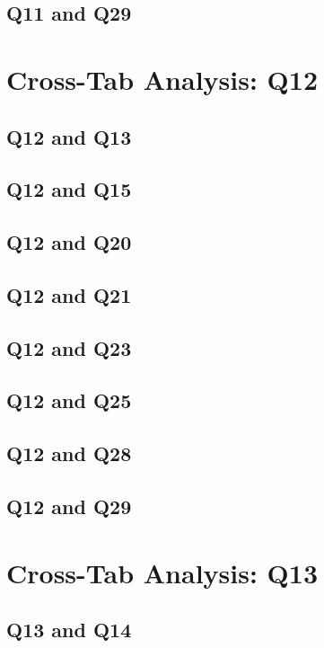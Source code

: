 \documentclass{report}
\begin{document}
\section{Q11 and Q29}\clearpage

\chapter{Cross-Tab Analysis: Q12}

\section{Q12 and Q13}\clearpage
\section{Q12 and Q15}\clearpage
\section{Q12 and Q20}\clearpage
\section{Q12 and Q21}\clearpage
\section{Q12 and Q23}\clearpage
\section{Q12 and Q25}\clearpage
\section{Q12 and Q28}\clearpage
\section{Q12 and Q29}\clearpage

\chapter{Cross-Tab Analysis: Q13}

\section{Q13 and Q14}\clearpage
\end{document}
